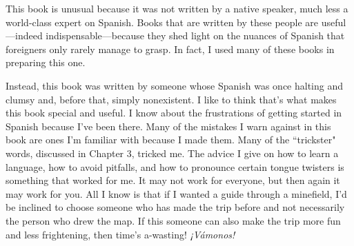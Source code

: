 This book is unusual because it was not written by a native
speaker, much less a world-class expert on Spanish. Books that are
written by these people are useful---indeed indispensable---because
they shed light on the nuances of Spanish that foreigners only rarely
manage to grasp. In fact, I used many of these books in preparing
this one.

Instead, this book was written by someone whose Spanish was
once halting and clumsy and, before that, simply nonexistent. I like to
think that's what makes this book special and useful. I know about the
frustrations of getting started in Spanish because I've been there. Many
of the mistakes I warn against in this book are ones I'm familiar with
because I made them. Many of the ``trickster" words, discussed in
Chapter 3, tricked me. The advice I give on how to learn a language,
how to avoid pitfalls, and how to pronounce certain tongue twisters
is something that worked for me. It may not work for everyone, but
then again it may work for you. All I know is that if I wanted a guide
through a minefield, I'd be inclined to choose someone who has made
the trip before and not necessarily the person who drew the map. If
this someone can also make the trip more fun and less frightening,
then time's a-wasting! \emph{¡Vámonos!}
